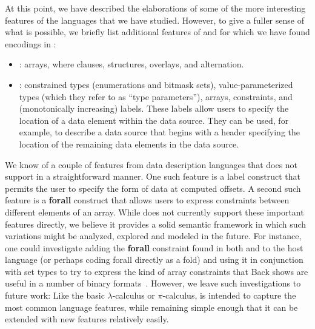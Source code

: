 At this point, we have described the elaborations of some of the more
interesting features of the languages that we have studied. However,
to give a fuller sense of what is possible, we briefly list additional
features of \datascript{} and \packettypes{} for which we have found
encodings in \ddc{}:
\begin{itemize}
\item \packettypes{}: arrays, where clauses, structures, overlays,
  and alternation.
\item \datascript{}: constrained types (enumerations and bitmask
  sets), value-parameterized types (which they refer to as ``type
  parameters''), arrays, constraints, and (monotonically increasing)
  labels. These labels allow users to specify the location of a data
  element within the data source. They can be used, for example, to
  describe a data source that begins with a header specifying the
  location of the remaining data elements in the data source.
\end{itemize}

We know of a couple of features from data description languages that
\ddc{} does not support in a straightforward manner.  One such feature is 
a label construct that permits the user to specify the form of data
at computed offsets.  A second
such feature is a {\bf forall} construct that
allows users to express constraints between different
elements of an array.  
While \ddc{} does not currently support these important
features directly, we believe it provides a solid semantic framework
in which such variations might be analyzed, explored and 
modeled in the future.  
For instance, one could investigate adding the  {\bf forall}
constraint found in both \datascript{} and \padsc{}
to the \ddc{} host language (or perhaps coding forall directly as a fold)
and using it in conjunction with \ddc{} set types
to try to express the kind of array constraints that Back shows are useful
in a number of binary formats~\cite{gpce02}.  However, we leave such
investigations to future work:  Like the basic $\lambda$-calculus
or $\pi$-calculus, \ddc{} is intended to capture the most common language
features, while remaining simple enough that it can be extended
with new features relatively easily.


